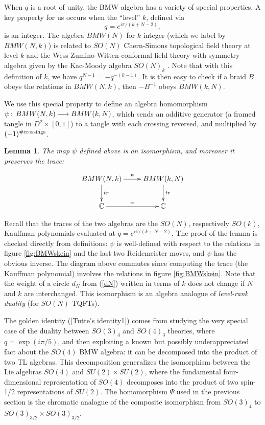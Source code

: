 \documentclass[11pt]{amsart}
\numberwithin{equation}{section}
\newtheorem{lem}[cor]{Lemma}
\theoremstyle{definition}
\newcommand{\co}{\colon\thinspace}
\begin{document}


When $q$ is a root of unity, the BMW algebra has a variety of
special properties. A key property for us occurs when the ``level''
$k$, defined via
$$q=e^{i\pi/(k+N-2)},$$
is an integer. The algebra
$BMW(N)$ for $k$ integer (which we label by $BMW(N,k)$)
is related to $SO(N)$ Chern-Simons topological field
theory at level $k$ and the
Wess-Zumino-Witten conformal field theory with symmetry algebra given
by the Kac-Moody algebra $SO(N)_k$ \cite{Witten,W}.
Note that with this definition of $k$, we have $q^{N-1}=- q^{-(k-1)}$.
It is then easy to check if a braid $B$ obeys the relations in
$BMW(N,k)$, then $-B^{-1}$ obeys $BMW(k,N)$.

We use this special property to define an algebra homomorphism
${\psi}\co BMW(N,k)\longrightarrow BMW(k,N)$, which sends an additive
generator (a framed tangle in $D^2\times [0,1]$) to a tangle with each
crossing reversed, and multiplied by $(-1)^{\# {\rm crossings}}$.
\begin{lem} \label{lem:level rank}\sl
The map $\psi$ defined above is an isomorphism, and moreover it preserves the trace:
\begin{equation} \label{level rank diagram} \xymatrix{ BMW(N,k)  \ar[d]^{tr} \ar[r]^{\psi} & BMW(k,N)  \ar[d]^{tr}\\
{\mathbb C}\ar[r]^=  &  {\mathbb C} }
\end{equation}
\end{lem}

Recall that the traces of the two algebras are the $SO(N)$,
respectively $SO(k)$, Kauffman polynomials evaluated at
$q=e^{i\pi/(k+N-2)}$. The proof of the lemma is checked directly from
definitions: ${\psi}$ is well-defined with respect to the relations in
figure \ref{fig:BMWskein} and the last two Reidemeister moves, and
${\psi}$ has the obvious inverse. The diagram above commutes since
computing the trace (the Kauffman polynomial) involves the relations
in figure \ref{fig:BMWskein}.  Note that the weight of a circle $d_N$
from (\ref{dN}) written in terms of $k$ does not change if $N$ and $k$
are interchanged. This isomorphism is an algebra analogue of {\em
level-rank duality} (for $SO(N)$ TQFTs).

The golden identity (\ref{Tutte's identity1}) comes from studying the
very special case of the duality between $SO(3)_4$ and $SO(4)_3$
theories, where $q=\exp(i\pi/5)$, and then exploiting a known
but possibly underappreciated fact about the $SO(4)$
BMW algebra: it can be decomposed into the product of two TL
algebras. This decomposition generalizes
the isomorphism between the Lie algebras
$SO(4)$ and $SU(2)\times SU(2)$, where
the fundamental four-dimensional representation of $SO(4)$ decomposes
into the product of two spin-1/2 representations of $SU(2)$.
The homomorphism $\Psi$ used in the previous section is the chromatic
analogue of the composite isomorphism from $SO(3)_4$ to
$SO(3)_{3/2}\times SO(3)_{3/2}$.
\end{document}
